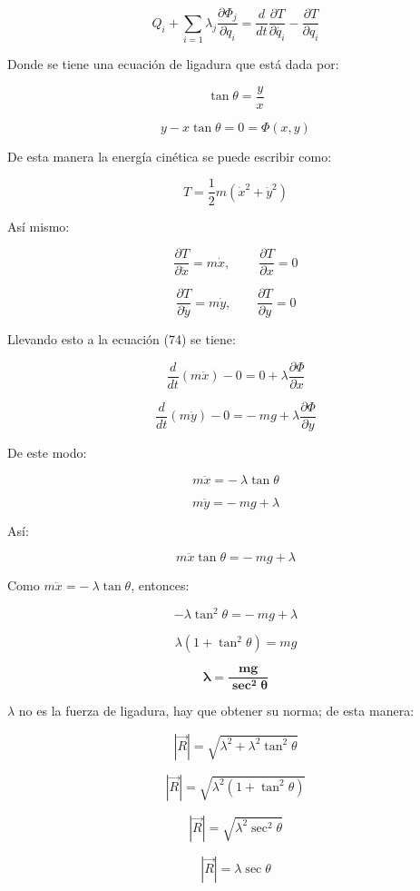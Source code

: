 \documentclass[]{article}
\begin{document}
\[Q_{i} + \sum_{i = 1}^{}{\lambda_{j}\frac{\partial\Phi_{j}}{\partial q_{i}}} = \frac{d}{dt}\frac{\partial T}{\partial\dot{q_{i}}} - \frac{\partial T}{\partial q_{i}}\]

Donde se tiene una ecuación de ligadura que está dada por:

\[\tan\theta = \frac{y}{x}\]

\[y - x\tan\theta = 0 = \Phi(x,y)\]

De esta manera la energía cinética se puede escribir como:

\[T = \frac{1}{2}m\left( {\dot{x}}^{2} + {\dot{y}}^{2} \right)\]

Así mismo:

\[\frac{\partial T}{\partial\dot{x}} = m\dot{x},\ \ \ \ \ \ \ \ \ \ \frac{\partial T}{\partial x} = 0\]

\[\frac{\partial T}{\partial\dot{y}} = m\dot{y},\ \ \ \ \ \ \ \ \ \frac{\partial T}{\partial y} = 0\]

Llevando esto a la ecuación (74) se tiene:

\[\frac{d}{dt}\left( m\dot{x} \right) - 0 = 0 + \lambda\frac{\partial\Phi}{\partial x}\]

\[\frac{d}{dt}\left( m\dot{y} \right) - 0 = - \ mg + \lambda\frac{\partial\Phi}{\partial y}\]

De este modo:

\[m\ddot{x} = - \ \lambda\tan\theta\]

\[m\ddot{y} = - \ mg + \lambda\]

Así:

\[m\ddot{x}\tan\theta = - \ mg + \lambda\]

Como \(m\ddot{x} = - \ \lambda\tan\theta\), entonces:

\[- \lambda\tan^{2}\theta = - \ mg + \lambda\]

\[\lambda\left( 1 + \tan^{2}\theta \right) = mg\]

\[\mathbf{\lambda =}\frac{\mathbf{mg}}{\mathbf{\sec}^{\mathbf{2}}\mathbf{\theta}}\]

\(\lambda\) no es la fuerza de ligadura, hay que obtener su norma; de
esta manera:

\[\left| \overrightarrow{R} \right| = \sqrt{\lambda^{2} + \lambda^{2}\tan^{2}\theta}\]

\[\left| \overrightarrow{R} \right| = \sqrt{\lambda^{2}(1 + \tan^{2}\theta)}\]

\[\left| \overrightarrow{R} \right| = \sqrt{\lambda^{2}\sec^{2}\theta}\]

\[\left| \overrightarrow{R} \right| = \lambda\sec\theta\]
\end{document}
